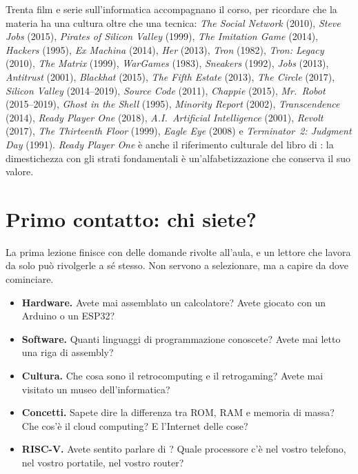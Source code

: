 \begin{prgaside}[Cineforum]
Trenta film e serie sull'informatica accompagnano il corso, per ricordare che
la materia ha una cultura oltre che una tecnica: \emph{The Social
Network} (2010), \emph{Steve Jobs} (2015), \emph{Pirates of Silicon Valley}
(1999), \emph{The Imitation Game} (2014), \emph{Hackers} (1995), \emph{Ex
Machina} (2014), \emph{Her} (2013), \emph{Tron} (1982), \emph{Tron: Legacy}
(2010), \emph{The Matrix} (1999), \emph{WarGames} (1983), \emph{Sneakers}
(1992), \emph{Jobs} (2013), \emph{Antitrust} (2001), \emph{Blackhat} (2015),
\emph{The Fifth Estate} (2013), \emph{The Circle} (2017), \emph{Silicon
Valley} (2014--2019), \emph{Source Code} (2011), \emph{Chappie} (2015),
\emph{Mr.\ Robot} (2015--2019), \emph{Ghost in the Shell} (1995),
\emph{Minority Report} (2002), \emph{Transcendence} (2014), \emph{Ready Player
One} (2018), \emph{A.I.\ Artificial Intelligence} (2001), \emph{Revolt}
(2017), \emph{The Thirteenth Floor} (1999), \emph{Eagle Eye} (2008) e
\emph{Terminator~2: Judgment Day} (1991). \emph{Ready Player One} è anche il
riferimento culturale del libro di \prg: la dimestichezza con gli strati
fondamentali è un'alfabetizzazione che conserva il suo valore.
\end{prgaside}

\section{Primo contatto: chi siete?}

La prima lezione finisce con delle domande rivolte all'aula, e un lettore che
lavora da solo può rivolgerle a sé stesso. Non servono a selezionare, ma a
capire da dove cominciare.

\begin{itemize}
\item \textbf{Hardware.} Avete mai assemblato un calcolatore? Avete giocato
  con un Arduino o un ESP32?
\item \textbf{Software.} Quanti linguaggi di programmazione conoscete? Avete
  mai letto una riga di assembly?
\item \textbf{Cultura.} Che cosa sono il retrocomputing e il retrogaming?
  Avete mai visitato un museo dell'informatica?
\item \textbf{Concetti.} Sapete dire la differenza tra ROM, RAM e memoria di
  massa? Che cos'è il cloud computing? E l'Internet delle cose?
\item \textbf{RISC-V.} Avete sentito parlare di \riscv? Quale processore c'è
  nel vostro telefono, nel vostro portatile, nel vostro router?
\end{itemize}

